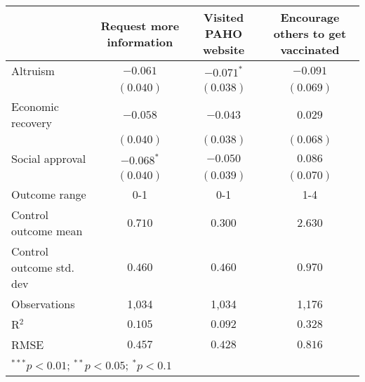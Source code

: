 \begin{table}
\begin{center}
\begin{tabular}{l c c c}
\hline
 & Request more information & Visited PAHO website & Encourage others to get vaccinated \\
\hline
Altruism                 & $-0.061$     & $-0.071^{*}$ & $-0.091$  \\
                         & $(0.040)$    & $(0.038)$    & $(0.069)$ \\
Economic recovery        & $-0.058$     & $-0.043$     & $0.029$   \\
                         & $(0.040)$    & $(0.038)$    & $(0.068)$ \\
Social approval          & $-0.068^{*}$ & $-0.050$     & $0.086$   \\
                         & $(0.040)$    & $(0.039)$    & $(0.070)$ \\
\hline
Outcome range            & 0-1          & 0-1          & 1-4       \\
Control outcome mean     & $0.710$      & $0.300$      & $2.630$   \\
Control outcome std. dev & $0.460$      & $0.460$      & $0.970$   \\
Observations             & 1,034        & 1,034        & 1,176     \\
R$^{2}$                  & $0.105$      & $0.092$      & $0.328$   \\
RMSE                     & $0.457$      & $0.428$      & $0.816$   \\
\hline
\multicolumn{4}{l}{\scriptsize{$^{***}p<0.01$; $^{**}p<0.05$; $^{*}p<0.1$}}
\end{tabular}
\caption{}
\label{table:Tables and Figures/SI_table23_motiv_Peru_behav}
\end{center}
\end{table}
